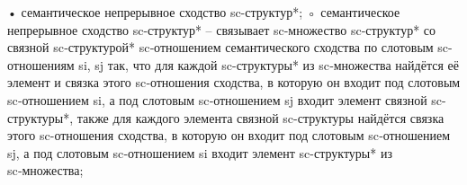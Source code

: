 \begin{SCn}
\end{SCn}
• семантическое непрерывное сходство sc-структур*;
◦ семантическое непрерывное сходство sc-структур* – связывает sc-множество sc‑структур* со связной sc‑структурой* sc‑отношением семантического сходства по слотовым sc-отношениям si, sj так, что для каждой sc-структуры* из sc‑множества найдётся её элемент и связка этого sc‑отношения сходства, в которую он входит под слотовым sc‑отношением si, а под слотовым sc‑отношением sj входит элемент связной sc-структуры*, также для каждого элемента связной sc-структуры найдётся связка этого sc-отношения сходства, в которую он входит под слотовым sc‑отношением sj, а под слотовым sc‑отношением si входит элемент sc-структуры* из sc‑множества;
%